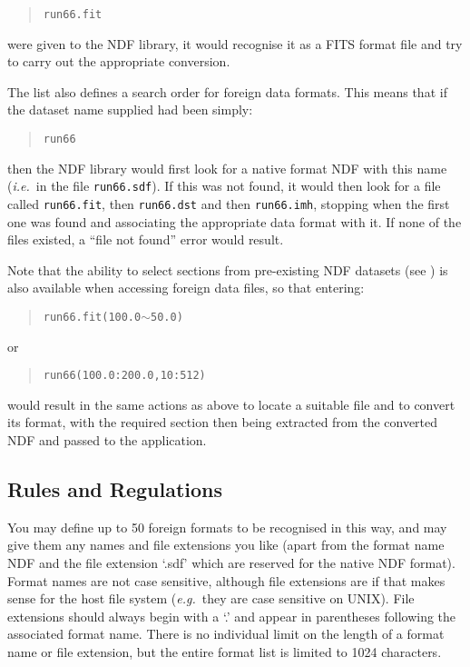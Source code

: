 \documentclass[11pt,twoside,nolof]{starlink}
\providecommand{\file}[1]{{\tt{#1}}}
\providecommand{\st}[1]{{\em{#1}}}
\begin{document}
\begin{quote}
\file{run66.fit}
\end{quote}

were given to the NDF library, it would recognise it as a FITS format
file and try to carry out the appropriate conversion.

The list also defines a search order for foreign data formats. This
means that if the dataset name supplied had been simply:

\begin{quote}
\file{run66}
\end{quote}

then the NDF library would first look for a native format NDF with
this name (\st{i.e.}\ in the file \file{run66.sdf}). If this was not
found, it would then look for a file called \file{run66.fit}, then
\file{run66.dst} and then \file{run66.imh}, stopping when the first
one was found and associating the appropriate data format with it. If
none of the files existed, a ``file not found'' error would result.

Note that the ability to select sections from pre-existing NDF
datasets (see
) is also
available when accessing foreign data files, so that entering:

\begin{quote}
\file{run66.fit(100.0$\sim$50.0)}
\end{quote}

or

\begin{quote}
\file{run66(100.0:200.0,10:512)}
\end{quote}

would result in the same actions as above to locate a suitable file
and to convert its format, with the required section then being
extracted from the converted NDF and passed to the application.

\subsection{\label{sect:rules}Rules and Regulations}

You may define up to 50 foreign formats to be recognised in this way,
and may give them any names and file extensions you like (apart from
the format name NDF and the file extension `.sdf' which are reserved
for the native NDF format). Format names are not case sensitive,
although file extensions are if that makes sense for the host file
system (\st{e.g.}\ they are case sensitive on UNIX).  File extensions
should always begin with a `.' and appear in parentheses following the
associated format name.  There is no individual limit on the length of
a format name or file extension, but the entire format list is limited
to 1024 characters.
\end{document}
